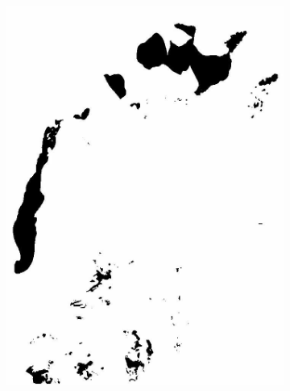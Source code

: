\documentclass[12pt,a4paper]{article}
\begin{document}
\begin{figure}
\begin{subfigure}[b]{0.19\textwidth}
         \includegraphics[width=\textwidth]{../img/2019w.jpg}
         \caption{}
         \label{fig:}
     \end{subfigure}
     \begin{subfigure}[b]{0.19\textwidth}
         \centering

\end{subfigure}
\end{figure}
\end{document}
